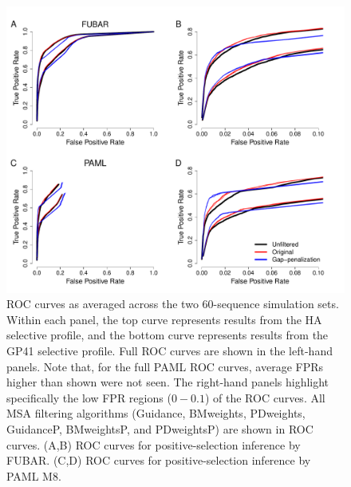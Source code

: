 \documentclass[11pt]{article}
\begin{document}
\begin{figure}[H]
\centerline{\includegraphics[width=6in]{Figures/ROC_prk.pdf}}
\caption{\label{roc} ROC curves as averaged across the two 60-sequence simulation sets. Within each panel, the top curve represents results from the HA selective profile, and the bottom curve represents results from the GP41 selective profile. Full ROC curves are shown in the left-hand panels. Note that, for the full PAML ROC curves, average FPRs higher than shown were not seen. The right-hand panels highlight specifically the low FPR regions ($0-0.1$) of the ROC curves. All MSA filtering algorithms (Guidance, BMweights, PDweights, GuidanceP, BMweightsP, and PDweightsP) are shown in ROC curves. (A,B) ROC curves for positive-selection inference by FUBAR. (C,D) ROC curves for positive-selection inference by PAML M8.}
\end{figure}
\end{document}
